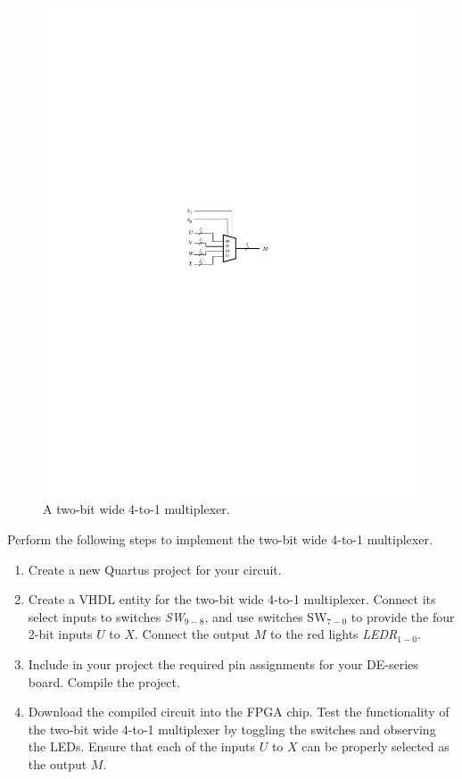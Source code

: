 \documentclass[epsfig,10pt,fullpage]{article}
\begin{document}
\begin{figure}[H]
	\begin{center}
		\includegraphics[]{figures/figure5.pdf}
	\end{center}
\caption{A two-bit wide 4-to-1 multiplexer.}
\label{fig:5}
\end{figure}

Perform the following steps to implement the two-bit wide 4-to-1 multiplexer.
\begin{enumerate}
\item Create a new Quartus project for your circuit.
\item Create a VHDL entity for the two-bit wide 4-to-1 multiplexer. Connect its select
inputs to switches {\it SW}$_{9-8}$, and use switches SW$_{7-0}$ to
provide the four 2-bit inputs $U$ to $X$. Connect the 
output $M$ to the red lights {\it LEDR}$_{1-0}$.
\item Include in your project the required pin assignments for your DE-series board.
Compile the project.
\item Download the compiled circuit into the FPGA chip. Test the functionality of the 
two-bit wide 4-to-1 multiplexer by toggling the switches and observing the LEDs. Ensure
that each of the inputs $U$ to $X$ can be properly selected as the output $M$.
\end{enumerate}
\end{document}
